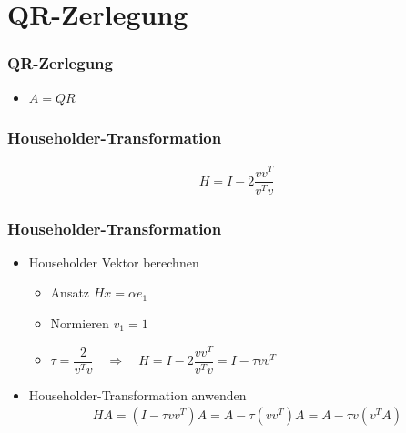 \section{QR-Zerlegung}
\begin{frame}
	\frametitle{QR-Zerlegung}
	\vspace{-4cm}
	\begin{itemize}
		\item $ A = QR $
	\end{itemize}
\end{frame}

\begin{frame}
	\frametitle{Householder-Transformation}
	\vspace{-1cm}
	\begin{align*}
		H = I - 2 \dfrac{vv^T}{v^Tv}
	\end{align*}
	\centering
	\scalebox{.8}{}

\end{frame}

\begin{frame}
	\frametitle{Householder-Transformation}
	\vspace{-1cm}
	\begin{itemize}
	\item Householder Vektor berechnen\\
		\begin{itemize}
			\item Ansatz $ Hx = \alpha e_1 $
			\item Normieren $ v_1 = 1 $
			\item $ \tau = \dfrac{2}{v^Tv} \quad \Longrightarrow \quad H = I - 2 \dfrac{vv^T}{v^Tv} = I - \tau vv^T$
		\end{itemize}
		

	\item  Householder-Transformation anwenden
		\begin{align*} 
		H A =(I - \tau vv^T) A= A - \tau (vv^T )A = A - \tau v(v^TA)
		\end{align*}
	\end{itemize}
\end{frame}

